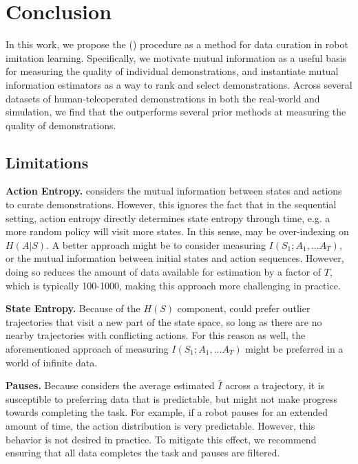 \section{Conclusion}

In this work, we propose the \fullname (\abv) procedure as a method for data curation in robot imitation learning. Specifically, we motivate mutual information as a useful basis for measuring the quality of individual demonstrations, and instantiate mutual information estimators as a way to rank and select demonstrations. Across several datasets of human-teleoperated demonstrations in both the real-world and simulation, we find that the \abv outperforms several prior methods at measuring the quality of demonstrations. 

\subsection{Limitations}

\noindent \textbf{Action Entropy.} \abv considers the mutual information between states and actions to curate demonstrations. However, this ignores the fact that in the sequential setting, action entropy directly determines state entropy through time, e.g. a more random policy will visit more states. In this sense, \abv may be over-indexing on $H(A|S)$. A better approach might be to consider measuring $I(S_1;A_1, ... A_T)$, or the mutual information between initial states and action sequences. However, doing so reduces the amount of data available for estimation by a factor of $T$, which is typically 100-1000, making this approach more challenging in practice.

\noindent \textbf{State Entropy.} Because of the $H(S)$ component, \abv could prefer outlier trajectories that visit a new part of the state space, so long as there are no nearby trajectories with conflicting actions. For this reason as well, the aforementioned approach of measuring $I(S_1;A_1, ... A_T)$ might be preferred in a world of infinite data.

\noindent \textbf{Pauses.} Because \abv considers the average estimated $\hat{I}$ across a trajectory, it is susceptible to preferring data that is predictable, but might not make progress towards completing the task. For example, if a robot pauses for an extended amount of time, the action distribution is very predictable. However, this behavior is not desired in practice. To mitigate this effect, we recommend ensuring that all data completes the task and pauses are filtered.

